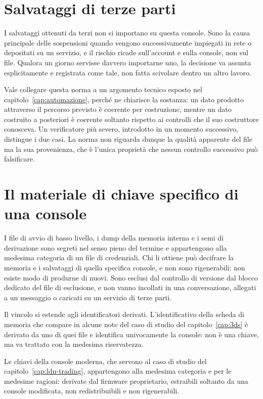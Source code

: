 \section{Salvataggi di terze parti}

I salvataggi ottenuti da terzi non si importano su questa console. Sono la causa principale delle sospensioni quando vengono successivamente impiegati in rete o depositati su un servizio, e il rischio ricade sull'account e sulla console, non sul file. Qualora un giorno servisse davvero importarne uno, la decisione va assunta esplicitamente e registrata come tale, non fatta scivolare dentro un altro lavoro.

Vale collegare questa norma a un argomento tecnico esposto nel capitolo~\ref{cap:automazione}, perché ne chiarisce la sostanza: un dato prodotto attraverso il percorso previsto è coerente per costruzione, mentre un dato costruito a posteriori è coerente soltanto rispetto ai controlli che il suo costruttore conosceva. Un verificatore più severo, introdotto in un momento successivo, distingue i due casi. La norma non riguarda dunque la qualità apparente del file ma la sua provenienza, che è l'unica proprietà che nessun controllo successivo può falsificare.

\section{Il materiale di chiave specifico di una console}

I file di avvio di basso livello, i dump della memoria interna e i semi di derivazione sono segreti nel senso pieno del termine e appartengono alla medesima categoria di un file di credenziali. Chi li ottiene può decifrare la memoria e i salvataggi di quella specifica console, e non sono rigenerabili: non esiste modo di produrne di nuovi. Sono esclusi dal controllo di versione dal blocco dedicato del file di esclusione, e non vanno incollati in una conversazione, allegati a un messaggio o caricati su un servizio di terze parti.

Il vincolo si estende agli identificatori derivati. L'identificativo della scheda di memoria che compare in alcune note del caso di studio del capitolo~\ref{cap:3ds} è derivato da uno di quei file e identifica univocamente la console: non è una chiave, ma va trattato con la medesima riservatezza.

Le chiavi della console moderna, che servono al caso di studio del capitolo~\ref{cap:ldn-trading}, appartengono alla medesima categoria e per le medesime ragioni: derivate dal firmware proprietario, estraibili soltanto da una console modificata, non redistribuibili e non rigenerabili.

